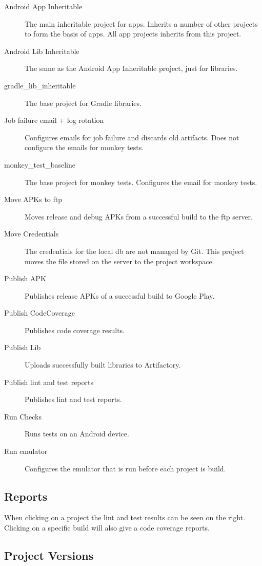 \begin{description}
  \item[Android App Inheritable] The main inheritable project for apps. Inherits a number of other projects to form the basis of apps. All app projects inherits from this project.
  \item[Android Lib Inheritable] The same as the Android App Inheritable project, just for libraries.
  \item[gradle\_lib\_inheritable] The base project for Gradle libraries.
  \item[Job failure email + log rotation] Configures emails for job failure and discards old artifacts. Does not configure the emails for monkey tests.
  \item[monkey\_test\_baseline] The base project for monkey tests. Configures the email for monkey tests.
  \item[Move APKs to ftp] Moves release and debug APKs from a successful build to the ftp server.
  \item[Move Credentials] The credentials for the local db are not managed by Git. This project moves the file stored on the server to the project workspace.
  \item[Publish APK] Publishes release APKs of a successful build to Google Play.
  \item[Publish CodeCoverage] Publishes code coverage results.
  \item[Publish Lib] Uploads successfully built libraries to Artifactory.
  \item[Publish lint and test reports] Publishes lint and test reports.
  \item[Run Checks] Runs tests on an Android device.
  \item[Run emulator] Configures the emulator that is run before each project is build.
\end{description}

\subsection{Reports}
When clicking on a project the lint and test results can be seen on the right. Clicking on a specific build will also give a code coverage reports.

\subsection{Project Versions}

